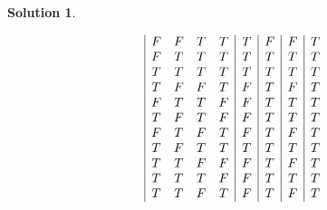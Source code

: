 \documentclass[10pt]{article}
\theoremstyle{definition}
\newtheorem{soln}{Solution}
\begin{document}
\begin{soln}
\begin{enumerate}[label=(\alph*)]
\begin{displaymath}
\begin{array}{|c c c c|c|c|c|c}
              F & F & T & T & T  & F   & F      & T        \\
              F & T & T & T & T  & T   & T      & T        \\
              T & T & T & T & T  & T   & T      & T        \\
              T & F & F & T & F  & T   & F      & T        \\
              F & T & T & F & F  & T   & T      & T        \\
              T & F & T & F & F  & T   & T      & T        \\
              F & T & F & T & F  & T   & F      & T        \\
              T & F & T & T & T  & T   & T      & T        \\
              T & T & F & F & F  & T   & F      & T        \\
              T & T & T & F & F  & T   & T      & T        \\
              T & T & F & T & F  & T   & F      & T        \\
            \end{array}
          \end{displaymath}
  \end{enumerate}
\end{soln}
\newpage
\end{document}

